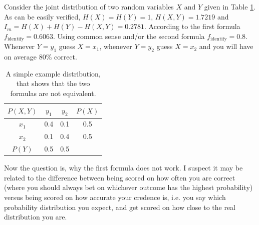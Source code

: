 \documentclass{scrartcl}
\begin{document}
Consider the joint distribution of two random variables $X$ and $Y$ given in Table \ref{ex}. As can be easily verified, $H(X) = H(Y) = 1$, $H(X,Y) = 1.7219$ and $I_m = H(X) + H(Y) - H(X, Y) = 0.2781$. According to the first formula $f_\mathrm{identify}=0.6063$. Using common sense and/or the second formula $f_\mathrm{identify}=0.8$. Whenever $Y=y_1$ guess $X=x_1$, whenever $Y=y_2$ guess $X=x_2$ and you will have on average 80\% correct.

\begin{table}
\centering
\begin{tabular}{c | c c | c}
$P(X, Y)$ & $y_1$ & $y_2$ & $P(X)$ \\  \hline
$x_1$ & 0.4 & 0.1 & 0.5 \\
$x_2$ & 0.1 & 0.4 & 0.5 \\ \hline 
$P(Y)$ & 0.5 & 0.5 &
\end{tabular}
\caption{A simple example distribution, that shows that the two formulas are not equivalent.}
\label{ex}
\end{table}

Now the question is, why the first formula does not work. I suspect it may be related to the difference between being scored on how often you are correct (where you should always bet on whichever outcome has the highest probability) versus being scored on how accurate your credence is, i.e. you say which probability distribution you expect, and get scored on how close to the real distribution you are.
\end{document}
